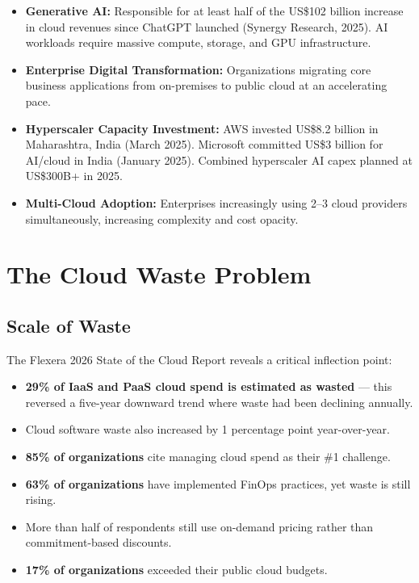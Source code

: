\documentclass[a4paper,11pt]{article}
\begin{document}
\begin{itemize}[itemsep=2mm]
    \item \textbf{Generative AI:} Responsible for at least half of the US\$102 billion increase in cloud revenues since ChatGPT launched (Synergy Research, 2025). AI workloads require massive compute, storage, and GPU infrastructure.
    \item \textbf{Enterprise Digital Transformation:} Organizations migrating core business applications from on-premises to public cloud at an accelerating pace.
    \item \textbf{Hyperscaler Capacity Investment:} AWS invested US\$8.2 billion in Maharashtra, India (March 2025). Microsoft committed US\$3 billion for AI/cloud in India (January 2025). Combined hyperscaler AI capex planned at US\$300B+ in 2025.
    \item \textbf{Multi-Cloud Adoption:} Enterprises increasingly using 2--3 cloud providers simultaneously, increasing complexity and cost opacity.
\end{itemize}

\section{The Cloud Waste Problem}

\subsection{Scale of Waste}

The Flexera 2026 State of the Cloud Report reveals a critical inflection point:

\begin{itemize}[itemsep=2mm]
    \item \textbf{29\% of IaaS and PaaS cloud spend is estimated as wasted} --- this reversed a five-year downward trend where waste had been declining annually.
    \item Cloud software waste also increased by 1 percentage point year-over-year.
    \item \textbf{85\% of organizations} cite managing cloud spend as their \#1 challenge.
    \item \textbf{63\% of organizations} have implemented FinOps practices, yet waste is still rising.
    \item More than half of respondents still use on-demand pricing rather than commitment-based discounts.
    \item \textbf{17\% of organizations} exceeded their public cloud budgets.
\end{itemize}
\end{document}

